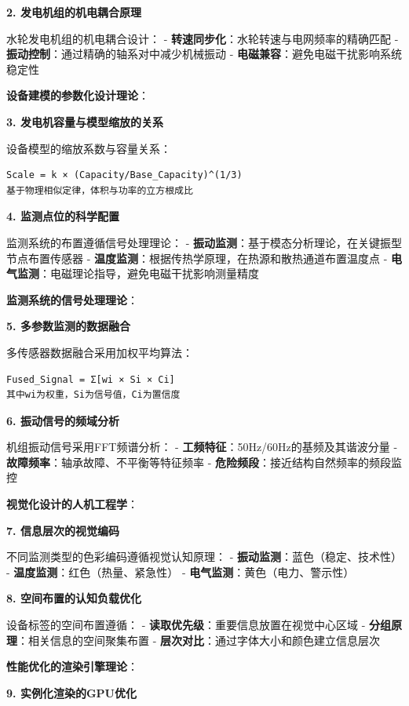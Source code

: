 \textbf{2. 发电机组的机电耦合原理}

水轮发电机组的机电耦合设计： - \textbf{转速同步化}：水轮转速与电网频率的精确匹配 - \textbf{振动控制}：通过精确的轴系对中减少机械振动 - \textbf{电磁兼容}：避免电磁干扰影响系统稳定性

\textbf{设备建模的参数化设计理论}：

\textbf{3. 发电机容量与模型缩放的关系}

设备模型的缩放系数与容量关系：

\begin{lstlisting}
Scale = k × (Capacity/Base_Capacity)^(1/3)
基于物理相似定律，体积与功率的立方根成比
\end{lstlisting}

\textbf{4. 监测点位的科学配置}

监测系统的布置遵循信号处理理论： - \textbf{振动监测}：基于模态分析理论，在关键振型节点布置传感器 - \textbf{温度监测}：根据传热学原理，在热源和散热通道布置温度点 - \textbf{电气监测}：电磁理论指导，避免电磁干扰影响测量精度

\textbf{监测系统的信号处理理论}：

\textbf{5. 多参数监测的数据融合}

多传感器数据融合采用加权平均算法：

\begin{lstlisting}
Fused_Signal = Σ[wi × Si × Ci]
其中wi为权重，Si为信号值，Ci为置信度
\end{lstlisting}

\textbf{6. 振动信号的频域分析}

机组振动信号采用FFT频谱分析： - \textbf{工频特征}：50Hz/60Hz的基频及其谐波分量 - \textbf{故障频率}：轴承故障、不平衡等特征频率 - \textbf{危险频段}：接近结构自然频率的频段监控

\textbf{视觉化设计的人机工程学}：

\textbf{7. 信息层次的视觉编码}

不同监测类型的色彩编码遵循视觉认知原理： - \textbf{振动监测}：蓝色（稳定、技术性） - \textbf{温度监测}：红色（热量、紧急性） - \textbf{电气监测}：黄色（电力、警示性）

\textbf{8. 空间布置的认知负载优化}

设备标签的空间布置遵循： - \textbf{读取优先级}：重要信息放置在视觉中心区域 - \textbf{分组原理}：相关信息的空间聚集布置 - \textbf{层次对比}：通过字体大小和颜色建立信息层次

\textbf{性能优化的渲染引擎理论}：

\textbf{9. 实例化渲染的GPU优化}

